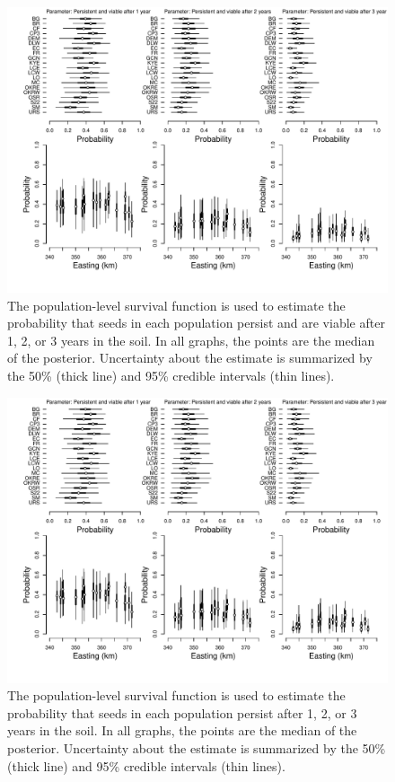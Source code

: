 \documentclass[12pt, oneside]{article}   	%
\begin{document}
 \begin{figure}[!h]
   \centering
       \includegraphics[page=1,width=\textwidth]{../../figures/cumulative-survival.pdf}  
    \caption{ The population-level survival function is used to estimate the probability that seeds in each population persist and are viable after 1, 2, or 3 years in the soil. In all graphs, the points are the median of the posterior. Uncertainty about the estimate is summarized by the 50\% (thick line) and 95\% credible intervals (thin lines). }
 \label{fig:viability-estimates-population}
\end{figure}

 \begin{figure}[!h]
   \centering
       \includegraphics[page=2,width=\textwidth]{../../figures/cumulative-survival.pdf}  
    \caption{ The population-level survival function is used to estimate the probability that seeds in each population persist after 1, 2, or 3 years in the soil. In all graphs, the points are the median of the posterior. Uncertainty about the estimate is summarized by the 50\% (thick line) and 95\% credible intervals (thin lines). }
 \label{fig:viability-estimates-population}
\end{figure}
\end{document}
